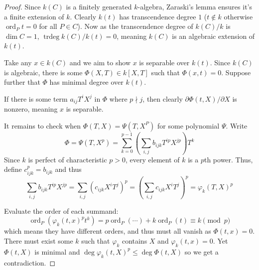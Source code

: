 \documentclass[12pt]{article}
\theoremstyle{remark}
\theoremstyle{definition}
\newcommand{\ord}[0]{\operatorname{ord}}
\newcommand{\trdeg}[0]{\operatorname{trdeg}}
\begin{document}
            \begin{proof}
                Since $k(C)$ is a finitely generated $k$-algebra, Zaraski's lemma ensures it's a finite extension of $k$. Clearly $k(t)$ has transcendence degree $1$ ($t\notin k$ otherwise $\ord_P t=0$ for all $P\in C$). Now as the transcendence degree of $k(C)/k$ is $\dim C=1$, $\trdeg k(C)/k(t)=0$, meaning $k(C)$ is an algebraic extension of $k(t)$.
    
                Take any $x\in k(C)$ and we aim to show $x$ is separable over $k(t)$. Since $k(C)$ is algebraic, there is some $\Phi(X, T)\in k[X, T]$ such that $\Phi(x, t)=0$. Suppose further that $\Phi$ has minimal degree over $k(t)$.
    
                If there is some term $a_{ij}T^iX^j$ in $\Phi$ where $p\nmid j$, then clearly $\partial\Phi(t, X)/\partial X$ is nonzero, meaning $x$ is separable.
    
                It remains to check when $\Phi(T, X)=\Psi(T, X^P)$ for some polynomial $\Psi$. Write
                \[\Phi=\Psi(T, X^p)=\sum_{k=0}^{p-1}\left(\sum_{i,j}b_{ijk}T^{ip}X^{jp}\right)T^k\]
                Since $k$ is perfect of characteristic $p>0$, every element of $k$ is a $p$th power. Thus, define $c_{ijk}^p=b_{ijk}$ and thus
                \[\sum_{i,j}b_{ijk}T^{ip}X^{jp}=\sum_{i,j}(c_{ijk}X^iT^j)^p=\left(\sum_{i,j}c_{ijk}X^iT^j\right)^p=\varphi_k(T, X)^p\]
                
                Evaluate the order of each summand:
                \[\ord_P(\varphi_k(t, x)^pt^k)=p\ord_P(\cdots)+k\ord_P(t)\equiv k\pmod{p}\]
                which means they have different orders, and thus must all vanish as $\Phi(t, x)=0$. There must exist some $k$ such that $\varphi_k$ contains $X$ and $\varphi_k(t, x)=0$. Yet $\Phi(t, X)$ is minimal and $\deg \varphi_k(t, X)^p\leqslant \deg \Phi(t, X)$ so we get a contradiction.
            \end{proof}
    
\end{document}
